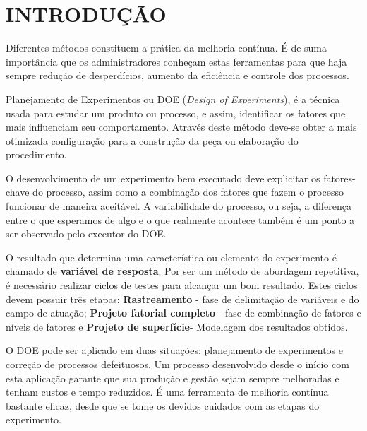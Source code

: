 \chapter{INTRODUÇÃO}
    Diferentes métodos constituem a prática da melhoria contínua. É de suma importância que os administradores conheçam estas ferramentas para que haja sempre redução de desperdícios, aumento da eficiência e controle dos processos.\cite{entenda_doe}

    Planejamento de Experimentos ou DOE (\textit{Design of Experiments}), é a técnica usada para estudar um produto ou processo, e assim, identificar os fatores que mais influenciam seu comportamento. Através deste método deve-se obter a mais otimizada configuração para a construção da peça ou elaboração do procedimento.\cite{oquee_doe}

    O desenvolvimento de um experimento bem executado deve explicitar os fatores-chave do processo, assim como a combinação dos fatores que fazem o processo funcionar de maneira aceitável. A variabilidade do processo, ou seja, a diferença entre o que esperamos de algo e o que realmente acontece também é um ponto a ser observado pelo executor do DOE.

    O resultado que determina uma característica ou elemento do experimento é chamado de \textbf{variável de resposta}. Por ser um método de abordagem repetitiva, é necessário realizar ciclos de testes para alcançar um bom resultado. Estes ciclos devem possuir três etapas: \textbf{Rastreamento} - fase de delimitação de variáveis e do campo de atuação; \textbf{Projeto fatorial completo} - fase de combinação de fatores e níveis de fatores e \textbf{Projeto de superfície}- Modelagem dos resultados obtidos.   

    O DOE pode ser aplicado em duas situações: planejamento de experimentos e correção de processos defeituosos. Um processo desenvolvido desde o início com esta aplicação garante que sua produção e gestão sejam sempre melhoradas e tenham custos e tempo reduzidos. É uma ferramenta de melhoria contínua bastante eficaz, desde que se tome os devidos cuidados com as etapas do experimento. \cite{oquee_doe}


    
    
    


